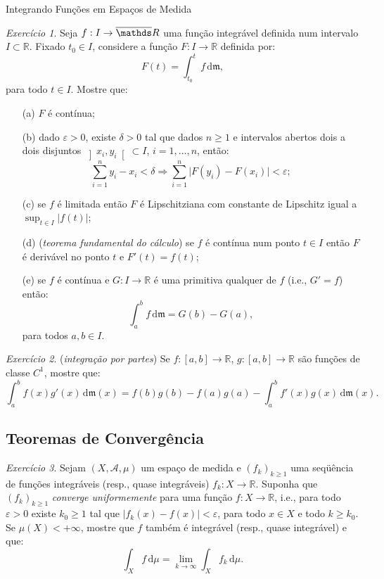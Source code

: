 \documentclass[oneside,final,11pt]{amsbook}
\newcommand{\R}{\mathds R}
\newcommand{\leb}{\mathfrak m}
\newcommand{\dd}{\mathrm d}
\theoremstyle{remark}\newtheorem{exercise}{Exercício}[chapter]
\theoremstyle{remark}\newtheorem{*exercise}[exercise]{\hbox to 0pt{\hskip 0pt minus 1fil*}Exercício}
\theoremstyle{definition}\newtheorem{exdefin}{Definição}[chapter]
\theoremstyle{plain}\newtheorem{teo}{Teorema}[section]
\theoremstyle{plain}\newtheorem{lem}[teo]{Lema}
\theoremstyle{plain}\newtheorem{prop}[teo]{Proposição}
\theoremstyle{plain}\newtheorem{cor}[teo]{Corolário}
\theoremstyle{definition}\newtheorem{defin}[teo]{Definição}
\theoremstyle{remark}\newtheorem{rem}[teo]{Observação}
\theoremstyle{definition}\newtheorem{notation}[teo]{Notação}
\theoremstyle{definition}\newtheorem{convention}[teo]{Convenção}
\theoremstyle{definition}\newtheorem{example}[teo]{Exemplo}
\numberwithin{section}{chapter}
\numberwithin{equation}{section}
\begin{document}
\begin{chapter}{Integrando Funções em Espaços de Medida}
\begin{exercise}
Seja $f:I\to\overline\R$ uma função integrável definida num intervalo $I\subset\R$.
Fixado $t_0\in I$, considere a função $F:I\to\R$ definida por:
\[F(t)=\int_{t_0}^tf\,\dd\leb,\]
para todo $t\in I$. Mostre que:
\begin{itemize}
\item[(a)] $F$ é contínua;
\item[(b)] dado $\varepsilon>0$, existe $\delta>0$ tal que dados $n\ge1$ e
intervalos abertos dois a dois disjuntos $\left]x_i,y_i\right[\subset I$, $i=1,\ldots,n$,
então:
\[\sum_{i=1}^ny_i-x_i<\delta\Longrightarrow\sum_{i=1}^n\vert F(y_i)-F(x_i)\vert<\varepsilon;\]
\item[(c)] se $f$ é limitada então $F$ é Lipschitziana com constante de Lipschitz igual a
$\sup_{t\in I}\vert f(t)\vert$;
\item[(d)] ({\em teorema fundamental do cálculo})
se $f$ é contínua num ponto $t\in I$ então $F$ é derivável no ponto $t$
e $F'(t)=f(t)$;
\item[(e)] se $f$ é contínua e $G:I\to\R$ é uma primitiva qualquer de $f$ (i.e., $G'=f$)
então:
\[\int_a^bf\,\dd\leb=G(b)-G(a),\]
para todos $a,b\in I$.
\end{itemize}
\end{exercise}

\begin{exercise}
({\em integração por partes})
Se $f:[a,b]\to\R$, $g:[a,b]\to\R$ são funções de classe $C^1$, mostre que:
\[\int_a^bf(x)g'(x)\,\dd\leb(x)=f(b)g(b)-f(a)g(a)-\int_a^bf'(x)g(x)\,\dd\leb(x).\]
\end{exercise}

\subsection*{Teoremas de Convergência}

\begin{exercise}\label{exe:intconvunif}
Sejam $(X,\mathcal A,\mu)$ um espaço de medida e $(f_k)_{k\ge1}$ uma seqüência
de funções integráveis (resp., quase integráveis) $f_k:X\to\R$. Suponha que $(f_k)_{k\ge1}$
{\em converge uniformemente\/}%
 para uma função $f:X\to\R$, i.e.,
para todo $\varepsilon>0$ existe $k_0\ge1$ tal que
$\vert f_k(x)-f(x)\vert<\varepsilon$, para todo $x\in X$ e todo $k\ge k_0$. Se $\mu(X)<+\infty$, mostre que $f$ também é
integrável (resp., quase integrável) e que:
\[\int_Xf\,\dd\mu=\lim_{k\to\infty}\int_Xf_k\,\dd\mu.\]
\end{exercise}


\end{chapter}
\end{document}
